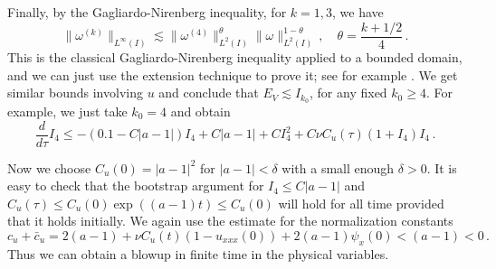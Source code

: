 \documentclass[12pt]{caltech_thesis}
\numberwithin{equation}{section}
\begin{document}
    
    Finally, by the Gagliardo-Nirenberg inequality, for $k=1,3$, we have $$\|\omega^{(k)}\|_{L^{\infty}(I)}\lesssim \|\omega^{(4)}\|^{\theta}_{L^{2}(I)}\|\omega\|^{1-\theta}_{L^{2}(I)}\,, \quad \theta=\frac{k+1/2}{4}\,.$$
    This is the classical Gagliardo-Nirenberg inequality applied to a bounded domain, and we can just use the extension technique to prove it; see for example \cite{li2021note}. We get similar bounds involving $u$ and  conclude that $E_V\lesssim I_{k_0}$, for any fixed $k_0\geq 4$. For example, we just take $k_0=4$ and obtain
    $$\frac{d}{d\tau}I_{4}\leq -(0.1-C|a-1|)I_{4}+C|a-1|+CI_{4}^2+C\nu C_u(\tau)(1+I_{4})I_{4}\,.$$


Now we choose $C_u(0)=|a-1|^2$ for $|a-1|<\delta$ with a small enough $\delta>0$. It is easy to check that the bootstrap argument for $I_{4}\leq C|a-1|$ and $C_u(\tau)\leq C_u(0)\exp((a-1)t)\leq C_u(0)$ will hold for all time provided that it holds initially. We again use the estimate for the normalization constants $$c_u+\bar{c}_u=2(a-1)+\nu C_u(t)(1-u_{xxx}(0))+2(a-1)\psi_x(0)<(a-1)<0\,.$$
    Thus we can obtain a blowup in finite time in the physical variables. 
\end{document}
